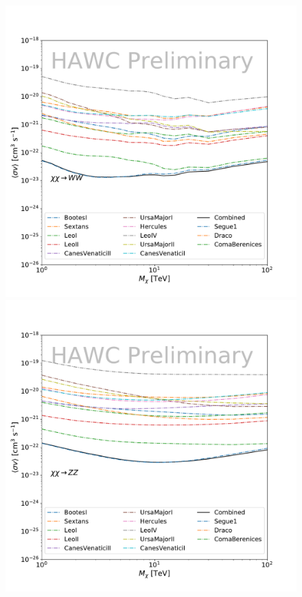 \begin{figure}[ht]
{    \includegraphics[scale=0.215]{figures/glory_duck/hawc/Combined95_GD_ww.pdf}
    \includegraphics[scale=0.215]{figures/glory_duck/hawc/Combined95_GD_zz.pdf}
}
\end{figure}
